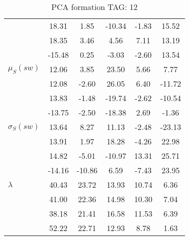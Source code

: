 \begin{table}[h!]
\begin{center}
\begin{tabular}{| l || c | c | c | c | c |}
 & 18.31  & 1.85  & -10.34  & -1.83  & 15.52 \\
 & 18.35  & 3.46  & 4.56  & 7.11  & 13.19 \\
 & -15.48  & 0.25  & -3.03  & -2.60  & 13.54 \\\hline
$\mu_S(sw)$ & 12.06  & 3.85  & 23.50  & 5.66  & 7.77 \\
 & 12.08  & -2.60  & 26.05  & 6.40  & -11.72 \\
 & 13.83  & -1.48  & -19.74  & -2.62  & -10.54 \\
 & -13.75  & -2.50  & -18.38  & 2.69  & -1.36 \\\hline
$\sigma_S(sw)$ & 13.64  & 8.27  & 11.13  & -2.48  & -23.13 \\
 & 13.91  & 1.97  & 18.28  & -4.26  & 22.98 \\
 & 14.82  & -5.01  & -10.97  & 13.31  & 25.71 \\
 & -14.16  & -10.86  & 6.59  & -7.43  & 23.95 \\\hline\hline
$\lambda$ & 40.43  & 23.72  & 13.93  & 10.74  & 6.36 \\
 & 41.00  & 22.36  & 14.98  & 10.30  & 7.04 \\
 & 38.18  & 21.41  & 16.58  & 11.53  & 6.39 \\
 & 52.22  & 22.71  & 12.93  & 8.78  & 1.63 \\\hline
\end{tabular}
\caption{PCA formation TAG: 12}
\end{center}
\end{table}